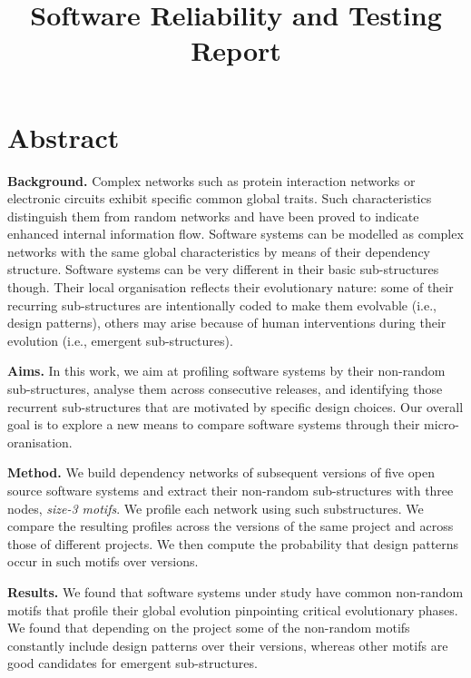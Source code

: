 \documentclass[article, onecolumn]{IEEEtran}
\begin{document}
\title{Software Reliability and Testing \\ Report }

\author{
}

\maketitle


\section{ Abstract}
\textbf{Background.}  
Complex networks such as  protein interaction networks or  electronic circuits exhibit specific common global traits. Such characteristics distinguish them from random networks and have been proved to indicate enhanced internal information flow. 
Software systems can be modelled as complex networks with the same global characteristics by means of their dependency structure. Software systems can be very different in their basic sub-structures though.  Their local organisation reflects their evolutionary nature: some of their recurring sub-structures are intentionally coded to make them evolvable (i.e., design patterns),  others may arise because of  human interventions during their evolution (i.e., emergent sub-structures).

\noindent
\textbf{Aims.} In this work, we aim at profiling software systems by their non-random sub-structures,  analyse them across consecutive releases, and identifying those recurrent sub-structures that are motivated by specific design choices. Our overall goal is to explore a new means to compare software systems through their micro- oranisation. 

\noindent
\textbf{Method.} We build dependency networks  of subsequent versions of five open source software systems and extract their non-random sub-structures with three nodes, \textit{size-3 motifs}. We  profile each network using such substructures. We compare the resulting profiles across the versions of the same project and across those of different  projects. We then compute  the probability that   design patterns occur in such motifs over versions. 

\noindent
\textbf{Results.} We found that software  systems under study have common non-random motifs that profile their global evolution pinpointing critical evolutionary phases. We found that depending on the project some of the non-random motifs constantly include design patterns over their versions, whereas other motifs are good candidates for emergent sub-structures. 
\end{document}
